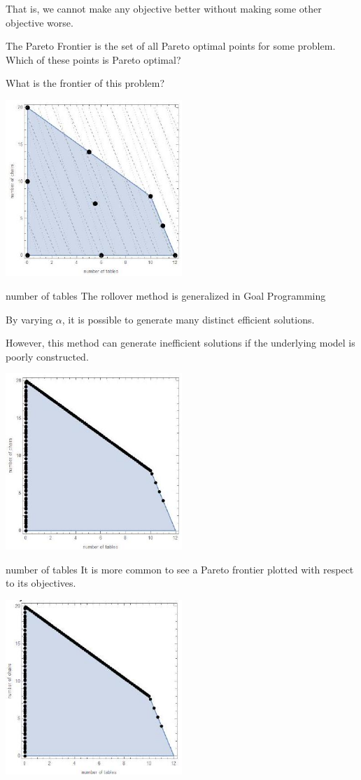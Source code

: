 That is, we cannot make any objective better without making some other objective worse.

The Pareto Frontier is the set of all Pareto optimal points for some problem. Which of these points is Pareto optimal?

What is the frontier of this problem?

\includegraphics[width=0.5\textwidth]{optimization/multi-objective/images/2022_02_28_634e8079070800ac7e3cg-13}

number of tables The rollover method is generalized in Goal Programming

By varying $\alpha$, it is possible to generate many distinct efficient solutions.

However, this method can generate inefficient solutions if the underlying model is poorly constructed.

\includegraphics[width=0.5\textwidth]{optimization/multi-objective/images/2022_02_28_634e8079070800ac7e3cg-14}

number of tables It is more common to see a Pareto frontier plotted with respect to its objectives.

\includegraphics[width=0.5\textwidth]{optimization/multi-objective/images/2022_02_28_634e8079070800ac7e3cg-15}

